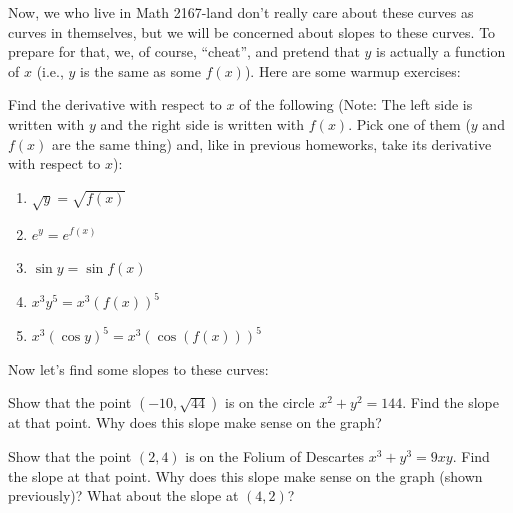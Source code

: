 \documentclass[handout]{ximera}
\begin{document}
Now, we who live in Math 2167-land don't really care about these curves as curves in themselves, but we will be concerned about slopes to these curves.  To prepare for that, we, of course, ``cheat'', and pretend that $y$ is actually a function of $x$ (i.e., $y$ is the same as some $f(x)$).  Here are some warmup exercises:

\begin{exercise} 
Find the derivative with respect to $x$ of the following (Note: The left side is written with $y$ and the right side is written with $f(x)$.  Pick one of them ($y$ and $f(x)$ are the same thing) and, like in previous homeworks, take its derivative with respect to $x$):
\begin{enumerate}
    \item $\sqrt{y} = \sqrt{f(x)}$
    \item $e^y = e^{f(x)}$
    \item $\sin y = \sin f(x)$
    \item $x^3y^5 = x^3(f(x))^5$
    \item $x^3 (\cos y)^5 = x^3(\cos (f(x)))^5$
\end{enumerate}
\end{exercise}
        Now let’s find some slopes to these curves:
\begin{exercise} 
Show that the point $(-10,  \sqrt{44})$ is on the circle  $x^2 + y^2 = 144$.  Find the slope at that point.  Why does this slope make sense on the graph?
\end{exercise}
\begin{exercise} 
Show that the point $(2, 4)$ is on the Folium of Descartes  $x^3+y^3=9xy$.  Find the slope at that point.  Why does this slope make sense on the graph (shown previously)?  What about the slope at $(4,2)$?
\end{exercise}
\end{document}
